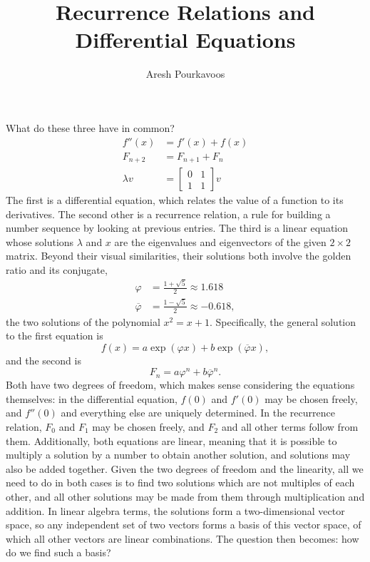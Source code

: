 \documentclass{article}
\begin{document}
\title{Recurrence Relations and Differential Equations}
\author{Aresh Pourkavoos}
\maketitle

What do these three have in common?
\begin{align*}
  f''(x) &= f'(x)+f(x) \\
  F_{n+2} &= F_{n+1}+F_n \\
  \lambda v &= \begin{bmatrix} 0 & 1 \\ 1 & 1 \end{bmatrix} v
\end{align*}
The first is a differential equation,
which relates the value of a function to its derivatives.
The second other is a recurrence relation,
a rule for building a number sequence by looking at previous entries.
The third is a linear equation whose solutions $\lambda$ and $x$ are
the eigenvalues and eigenvectors of the given $2 \times 2$ matrix.
Beyond their visual similarities,
their solutions both involve the golden ratio and its conjugate,
\begin{align*}
  \varphi &= \frac{1+\sqrt{5}}{2} \approx 1.618 \\
  \overline{\varphi} &= \frac{1-\sqrt{5}}{2} \approx -0.618,
\end{align*}
the two solutions of the polynomial
$x^2=x+1$.
Specifically, the general solution to the first equation is
\[f(x) = a\exp(\varphi x)+b\exp(\overline{\varphi}x),\]
and the second is
\[F_n = a\varphi^n+b\overline{\varphi}^n.\]
Both have two degrees of freedom,
which makes sense considering the equations themselves:
in the differential equation,
$f(0)$ and $f'(0)$ may be chosen freely,
and $f''(0)$ and everything else are uniquely determined.
In the recurrence relation,
$F_0$ and $F_1$ may be chosen freely,
and $F_2$ and all other terms follow from them.
Additionally, both equations are linear,
meaning that it is possible to multiply a solution by a number
to obtain another solution,
and solutions may also be added together.
Given the two degrees of freedom
and the linearity,
all we need to do in both cases
is to find two solutions
which are not multiples of each other,
and all other solutions may be made from them
through multiplication and addition.
In linear algebra terms,
the solutions form a two-dimensional vector space,
so any independent set of two vectors
forms a basis of this vector space,
of which all other vectors are linear combinations.
The question then becomes: how do we find such a basis?
\end{document}
